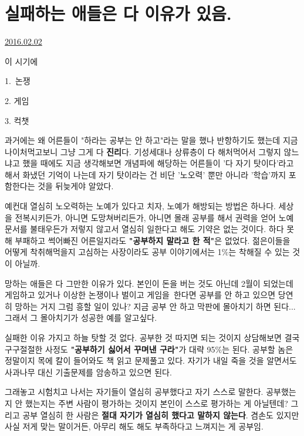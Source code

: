\section{실패하는 애들은 다 이유가 있음.}
\href{https://www.kockoc.com/Apoc/621373}{2016.02.02}

\vspace{5mm}

이 시기에
\vspace{5mm}

\item 1. 논쟁
\item 2. 게임
\item 3. 컥챗
\vspace{5mm}

과거에는 왜 어른들이 "하라는 공부는 안 하고"라는 말을 했나 반항하기도 했는데
지금 나이처먹고보니 그냥 그게 다 \textbf{진리}다.
기성세대나 상류층이 다 해처먹어서 그렇지 않느냐고 했을 때에도
지금 생각해보면 개념파에 해당하는 어른들이 '다 자기 탓이다'라고 해서 화냈던 기억이 나는데
자기 탓이라는 건 비단 '노오력' 뿐만 아니라 '학습'까지 포함한다는 것을 뒤늦게야 알았다.
\vspace{5mm}

예컨대 열심히 노오력하는 노예가 있다고 치자, 노예가 해방되는 방법은 하나다.
세상을 전복시키든가, 아니면 도망쳐버리든가, 아니면 몰래 공부를 해서 권력을 얻어 노예문서를 불태우든가
저렇지 않고서 열심히 일한다고 해도 기약은 없는 것이다.
하다 못해 부패하고 썩어빠진 어른일지라도 \textbf{"공부하지 말라고 한 적"}은 없었다.
젊은이들을 어떻게 착취해먹을지 고심하는 사장이라도 공부 이야기에서는 1$\%$는 착해질 수 있는 것이 아닐까.
\vspace{5mm}

망하는 애들은 다 그만한 이유가 있다.
본인이 돈을 버는 것도 아닌데
2월이 되었는데 게임하고 있거나 이상한 논쟁이나 벌이고 게임을 한다면 공부를 안 하고 있으면
당연히 망하는 거지 그럼 흥할 일이 있나?
지금 공부 안 하고 막판에 몰아치기 하면 된다... 그래서 그 몰아치기가 성공한 예를 알고싶다.
\vspace{5mm}

실패한 이유 가지고 하늘 탓할 것 없다. 공부한 것 따지면 되는 것이지
상담해보면 결국 구구절절한 사정도 \textbf{"공부하기 싫어서 꾸며낸 구라"}가 대략 95$\%$는 된다.
공부할 놈은 정말이지 목에 칼이 들어와도 책 읽고 문제풀고 있다.
자기가 내일 죽을 것을 알면서도 사과나무 대신 기출문제를 암송하고 있으면 된다.
\vspace{5mm}

그래놓고 시험치고 나서는 자기들이 열심히 공부했다고 자기 스스로 말한다.
공부했는지 안 했는지는 주변 사람이 평가하는 것이지 본인이 스스로 평가하는 게 아닐텐데?
그리고 공부 열심히 한 사람은 \textbf{절대 자기가 열심히 했다고 말하지 않는다}.
겸손도 있지만 사실 저게 맞는 말이거든, 아무리 해도 해도 부족하다고 느껴지는 게 공부임.
\vspace{5mm}

